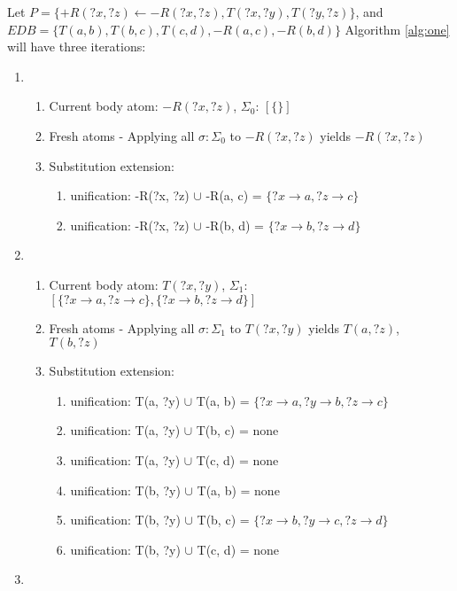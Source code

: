 \documentclass[sigconf,screen,review=false,natbib]{acmart}
\theoremstyle{definition}
\begin{document}
Let $P = \{+R(?x, ?z) \leftarrow -R(?x, ?z), T(?x, ?y), T(?y, ?z)\}$, and $EDB = \{T(a, b), T(b, c), T(c, d), -R(a, c), -R(b, d)\}$
Algorithm \ref{alg:one} will have three iterations:
\begin{enumerate}
	\item \begin{enumerate}
		      \item Current body atom: $-R(?x, ?z)$, $\Sigma_0$: $[\{\}]$
		      \item Fresh atoms - Applying all $\sigma : \Sigma_0$ to $-R(?x, ?z)$ yields $-R(?x, ?z)$
		      \item Substitution extension: \begin{enumerate}
			            \item unification: -R(?x, ?z) $\cup$ -R(a, c) = $\{?x \rightarrow a, ?z \rightarrow c\}$
			            \item unification: -R(?x, ?z) $\cup$ -R(b, d) = $\{?x \rightarrow b, ?z \rightarrow d\}$
		            \end{enumerate}
	      \end{enumerate}
	\item \begin{enumerate}
		      \item Current body atom: $T(?x, ?y)$, $\Sigma_1$: $[\{?x \rightarrow a, ?z \rightarrow c\}, \{?x \rightarrow b, ?z \rightarrow d\}]$
		      \item Fresh atoms - Applying all $\sigma : \Sigma_1$ to $T(?x, ?y)$ yields $T(a, ?z)$, $T(b, ?z)$
		      \item Substitution extension: \begin{enumerate}
			            \item unification: T(a, ?y) $\cup$ T(a, b) = $\{?x \rightarrow a, ?y \rightarrow b, ?z \rightarrow c\}$
			            \item unification: T(a, ?y) $\cup$ T(b, c) = none
			            \item unification: T(a, ?y) $\cup$ T(c, d) = none
			            \item unification: T(b, ?y) $\cup$ T(a, b) = none
			            \item unification: T(b, ?y) $\cup$ T(b, c) = $\{?x \rightarrow b, ?y \rightarrow c, ?z \rightarrow d\}$
			            \item unification: T(b, ?y) $\cup$ T(c, d) = none
		            \end{enumerate}
	      \end{enumerate}
	\item \begin{enumerate}

\end{enumerate}
\end{enumerate}
\end{document}
